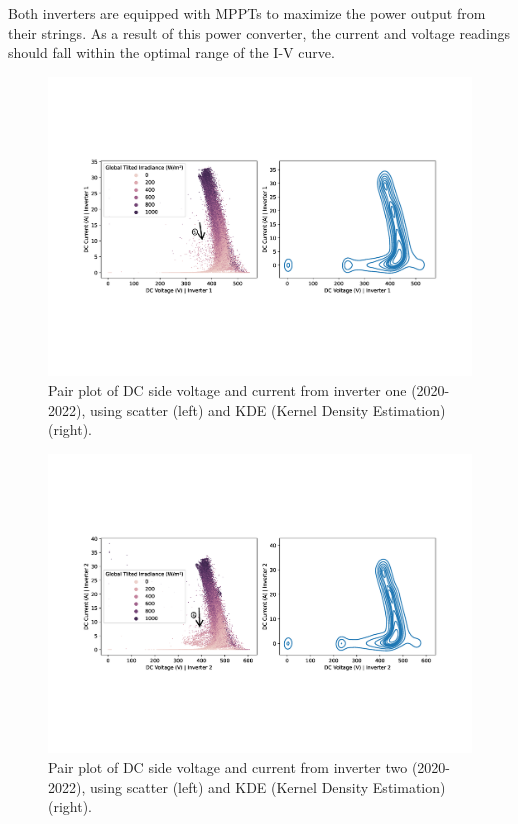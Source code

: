 Both inverters are equipped with MPPTs to maximize the power output from their strings. As a result of this power converter, the current and voltage readings should fall within the optimal range of the I-V curve.

\begin{figure}[h!]
    \centering
    \includegraphics[width=\textwidth,trim={0 5.5cm 0cm 5.5cm},clip]{figures/chapter5/analysis/04_voltage_current_pairplot_kb_1_annotated.pdf}
    \caption{Pair plot of DC side voltage and current from inverter one (2020-2022), using scatter (left) and KDE (Kernel Density Estimation) (right).}
    \label{fig:eda_volt_curr_pair_kb_1}
\end{figure}

\begin{figure}[h!]
    \centering
    \includegraphics[width=\textwidth,trim={0 5.5cm 0cm 5.5cm},clip]{figures/chapter5/analysis/06_voltage_current_pairplot_kb_2_annotated.pdf}
    \caption{Pair plot of DC side voltage and current from inverter two (2020-2022), using scatter (left) and KDE (Kernel Density Estimation) (right).}
    \label{fig:eda_volt_curr_pair_kb_2}
\end{figure}

